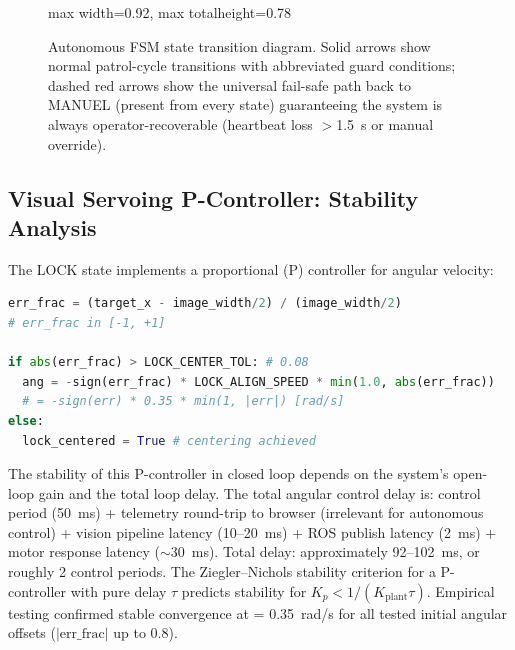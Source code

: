 \begin{figure}[htbp]
\begin{adjustbox}{max width=0.92\linewidth, max totalheight=0.78\textheight}
\end{adjustbox}
\caption{Autonomous FSM state transition diagram. Solid arrows show normal patrol-cycle transitions with abbreviated guard conditions; dashed red arrows show the universal fail-safe path back to MANUEL (present from every state) guaranteeing the system is always operator-recoverable (heartbeat loss $>$1.5~s or manual override).}
\label{fig:fsm-diagram}
\end{figure}

\subsection{Visual Servoing P-Controller: Stability Analysis}

The LOCK state implements a proportional (P) controller for angular velocity:

\begin{lstlisting}[language=Python, caption={LOCK-state visual servoing P-controller}, label={lst:p-controller}]
err_frac = (target_x - image_width/2) / (image_width/2)
# err_frac in [-1, +1]

if abs(err_frac) > LOCK_CENTER_TOL: # 0.08
  ang = -sign(err_frac) * LOCK_ALIGN_SPEED * min(1.0, abs(err_frac))
  # = -sign(err) * 0.35 * min(1, |err|) [rad/s]
else:
  lock_centered = True # centering achieved
\end{lstlisting}

The stability of this P-controller in closed loop depends on the system's open-loop gain and the total loop delay. The total angular control delay is: control period (50~ms) + telemetry round-trip to browser (irrelevant for autonomous control) + vision pipeline latency (10--20~ms) + ROS publish latency (2~ms) + motor response latency ($\sim$30~ms). Total delay: approximately 92--102~ms, or roughly 2 control periods. The Ziegler--Nichols stability criterion for a P-controller with pure delay $\tau$ predicts stability for $K_p < 1/(K_{\text{plant}} \tau)$. Empirical testing confirmed stable convergence at  = 0.35~rad/s for all tested initial angular offsets ($|\text{err\_frac}|$ up to 0.8).


